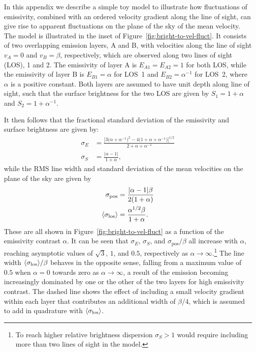 \documentclass[fleqn,usenatbib, useAMS, a4paper]{mnras}
\newcommand\pos{\ensuremath{_{\mathrm{pos}}}}
\begin{document}
In this appendix we describe a simple toy model to illustrate
how fluctuations of emissivity,
combined with an ordered velocity gradient along the line of sight,
can give rise to apparent fluctuations on the plane of the sky
of the mean velocity.
The model is illustrated in the inset of Figure~\ref{fig:bright-to-vel-fluct}.
It consists of two overlapping emission layers, A and B,
with velocities along the line of sight \(v_A = 0\) and \(v_B = \beta\), respectively,
which are observed along two lines of sight (LOS), 1 and 2.
The emissivity of layer A is \(E_{A1} = E_{A2} = 1\) for both LOS,
while the emissivity of layer B is \(E_{B1} = \alpha\) for LOS~1
and \(E_{B2} = \alpha^{-1}\) for LOS~2, where \(\alpha\) is a positive constant.
Both layers are assumed to have unit depth along line of sight,
such that the surface brightness for the two LOS are given by
\(S_1 = 1 + \alpha\) and \(S_2 = 1 + \alpha^{-1}\).


It then follows that the fractional standard deviation of the emissivity
and surface brightness are given by:
\begin{align}
  \label{eq:toy}
  \sigma_E &=
  \frac{
    \bigl[ 3\bigl(\alpha + \alpha^{-1}\bigr)^2 - 4\bigl(1 + \alpha + \alpha^{-1}\bigr)\bigr]^{1/2}
  }{
    2 + \alpha + \alpha^{-1}
  }
  \\
  \sigma_S &=   \frac{\vert\alpha - 1\vert}{1 + \alpha} ,
\end{align}
while the RMS line width and standard deviation of the mean velocities on the plane of the sky
are given by
\begin{align}
  \label{eq:toy}
  \sigma\pos &=\frac{\vert\alpha - 1\vert \beta}{2 (1 + \alpha)}
  \\
  \siglosm &=   \frac{\alpha^{1/2}\beta}{1 + \alpha}.
\end{align}
These are all shown in Figure~\ref{fig:bright-to-vel-fluct} as a function
of the emissivity contrast \(\alpha\).
It can be seen that \(\sigma_E\), \(\sigma_S\), and \(\sigma\pos/\beta\) all increase with \(\alpha\),
reaching asymptotic values of \(\sqrt{3}\), \(1\), and \(0.5\),
respectively as \(\alpha \to \infty\).\footnote{%
  To reach higher relative brightness dispersion \(\sigma_S > 1\) would require
  including more than two lines of sight in the model.
}
The line width \(\langle\sigma_{\mathrm{los}}\rangle/\beta\) behaves in the opposite sense, falling from
a maximum value of \(0.5\) when \(\alpha = 0\) towards zero as \(\alpha \to \infty\),
a result of the emission becoming increasingly dominated by one
or the other of the two layers for high emissivity contrast.
The dashed line shows the effect of including a small velocity gradient
within each layer that contributes an additional width of \(\beta/4\),
which is assumed to add in quadrature with \(\langle\sigma_{\mathrm{los}}\rangle\).
\end{document}
